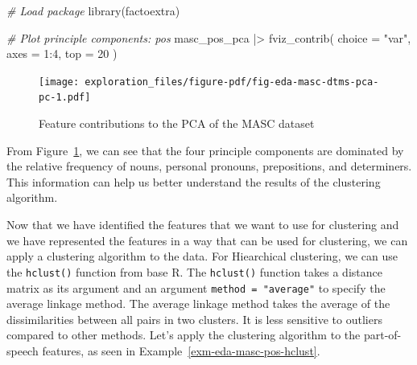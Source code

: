 \documentclass[
  letterpaper,
  DIV=11,
  numbers=noendperiod]{scrreport}
\newenvironment{Shaded}{\begin{snugshade}}{\end{snugshade}}
\newcommand{\AttributeTok}[1]{\textcolor[rgb]{0.00,0.00,0.00}{#1}}
\newcommand{\CommentTok}[1]{\textcolor[rgb]{0.00,0.00,0.00}{\textit{#1}}}
\newcommand{\DecValTok}[1]{\textcolor[rgb]{0.00,0.00,0.00}{#1}}
\newcommand{\FunctionTok}[1]{\textcolor[rgb]{0.00,0.00,0.00}{#1}}
\newcommand{\NormalTok}[1]{\textcolor[rgb]{0.00,0.00,0.00}{#1}}
\newcommand{\SpecialCharTok}[1]{\textcolor[rgb]{0.00,0.00,0.00}{#1}}
\newcommand{\StringTok}[1]{\textcolor[rgb]{0.00,0.00,0.00}{#1}}
\theoremstyle{definition}
\theoremstyle{remark}
\begin{document}
\begin{Shaded}
\begin{Highlighting}[]
\CommentTok{\# Load package}
\FunctionTok{library}\NormalTok{(factoextra)}

\CommentTok{\# Plot principle components: pos}
\NormalTok{masc\_pos\_pca }\SpecialCharTok{|\textgreater{}}
  \FunctionTok{fviz\_contrib}\NormalTok{(}
    \AttributeTok{choice =} \StringTok{"var"}\NormalTok{,}
    \AttributeTok{axes =} \DecValTok{1}\SpecialCharTok{:}\DecValTok{4}\NormalTok{,}
    \AttributeTok{top =} \DecValTok{20}
\NormalTok{  )}
\end{Highlighting}
\end{Shaded}

\begin{figure}[H]

{\centering \texttt{[image: exploration\_files/figure-pdf/fig-eda-masc-dtms-pca-pc-1.pdf]}

}

\caption{\label{fig-eda-masc-dtms-pca-pc}Feature contributions to the
PCA of the MASC dataset}

\end{figure}

From Figure~\ref{fig-eda-masc-dtms-pca-pc}, we can see that the four
principle components are dominated by the relative frequency of nouns,
personal pronouns, prepositions, and determiners. This information can
help us better understand the results of the clustering algorithm.

Now that we have identified the features that we want to use for
clustering and we have represented the features in a way that can be
used for clustering, we can apply a clustering algorithm to the data.
For Hiearchical clustering, we can use the \texttt{hclust()} function
from base R. The \texttt{hclust()} function takes a distance matrix as
its argument and an argument \texttt{method\ =\ "average"} to specify
the average linkage method. The average linkage method takes the average
of the dissimilarities between all pairs in two clusters. It is less
sensitive to outliers compared to other methods. Let's apply the
clustering algorithm to the part-of-speech features, as seen in
Example~\ref{exm-eda-masc-pos-hclust}.
\end{document}
